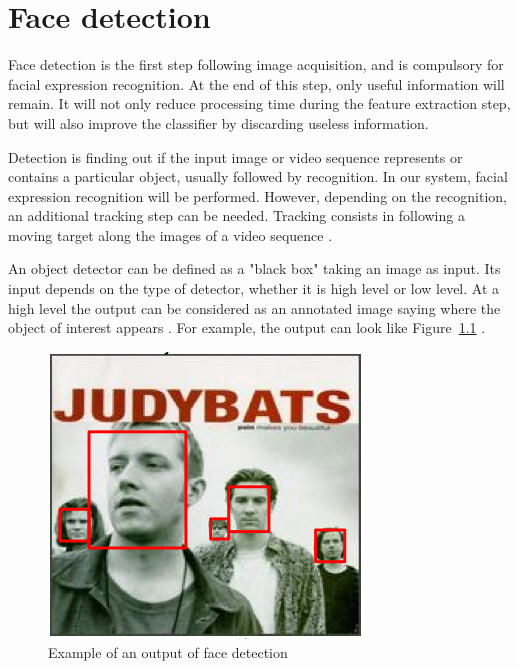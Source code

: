 \chapter{Face detection}

\noindent Face detection is the first step following image acquisition, and is compulsory for facial expression recognition. At the end of this step, only useful information will remain. It will not only reduce processing time during the feature extraction step, but will also improve the classifier by discarding useless information.
\newline

\noindent Detection is finding out if the input image or video sequence represents or contains a particular object, usually followed by recognition. In our system, facial expression recognition will be performed. However, depending on the recognition, an additional tracking step can be needed. Tracking consists in following a moving target along the images of a video sequence \cite{DIN08}.
\newline

\noindent An object detector can be defined as a "black box" taking an image as input. Its input depends on the type of detector, whether it is high level or low level. At a high level the output can be considered as an annotated image saying where the object of interest appears \cite{DIN08}. For example, the output can look like Figure~\ref{output_example_face_detection} \cite{DIN08}.
\newline

\begin{figure}[!h]
\begin{center}
\noindent \includegraphics[scale=0.7]{figures/output_example_face_detection} 
\newline
\caption{Example of an output of face detection \cite{DIN08}}
\label{output_example_face_detection}
\end{center} 
\end{figure}

